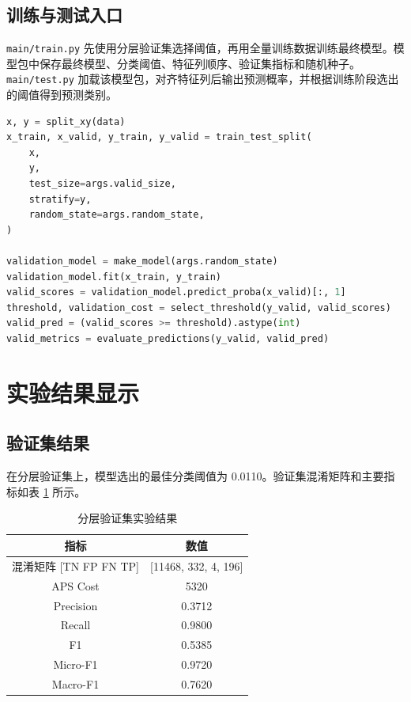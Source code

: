 \documentclass[UTF8,a4paper,10pt]{ctexart}
\begin{document}
\subsection{训练与测试入口}
\texttt{main/train.py} 先使用分层验证集选择阈值，再用全量训练数据训练最终模型。模型包中保存最终模型、分类阈值、特征列顺序、验证集指标和随机种子。\texttt{main/test.py} 加载该模型包，对齐特征列后输出预测概率，并根据训练阶段选出的阈值得到预测类别。

\begin{lstlisting}[title=训练阶段核心逻辑,frame=trbl,language=Python]
x, y = split_xy(data)
x_train, x_valid, y_train, y_valid = train_test_split(
    x,
    y,
    test_size=args.valid_size,
    stratify=y,
    random_state=args.random_state,
)

validation_model = make_model(args.random_state)
validation_model.fit(x_train, y_train)
valid_scores = validation_model.predict_proba(x_valid)[:, 1]
threshold, validation_cost = select_threshold(y_valid, valid_scores)
valid_pred = (valid_scores >= threshold).astype(int)
valid_metrics = evaluate_predictions(y_valid, valid_pred)
\end{lstlisting}

\section{实验结果显示}

\subsection{验证集结果}
在分层验证集上，模型选出的最佳分类阈值为 0.0110。验证集混淆矩阵和主要指标如表 \ref{tab:valid-result} 所示。

\begin{table}[H]
  \centering
  \begin{tabular}{cc}
  \toprule
  指标 & 数值\\
  \midrule
  混淆矩阵 [TN FP FN TP] & [11468, 332, 4, 196]\\
  APS Cost & 5320\\
  Precision & 0.3712\\
  Recall & 0.9800\\
  F1 & 0.5385\\
  Micro-F1 & 0.9720\\
  Macro-F1 & 0.7620\\
  \bottomrule
  \end{tabular}
  \caption{分层验证集实验结果}
  \label{tab:valid-result}
\end{table}
\end{document}

